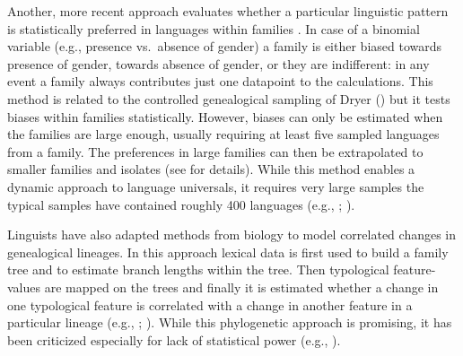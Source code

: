 \documentclass[output=collectionpaper]{langsci/langscibook}
\begin{document}
\newpage 
Another, more recent approach evaluates whether a particular linguistic pattern is statistically preferred in languages within families \citep{Bickel2013b}. In case of a binomial variable (e.g., presence vs.\ absence of gender) a family is either biased towards presence of gender, towards absence of gender, or they are indifferent: in any event a family always contributes just one datapoint to the calculations. This method is related to the controlled genealogical sampling of Dryer (\citeyear{Dryer1992,Dryer2000}) but it tests biases within families statistically. However, biases can only be estimated when the families are large enough, usually requiring at least five sampled languages from a family. The preferences in large families can then be extrapolated to smaller families and isolates (see \citealt{Bickel2013b} for details). While this method enables a dynamic approach to language universals, it requires very large samples \textendash{} the typical samples have contained roughly 400 languages (e.g., \citealt{Bickel2013b}; \citealt{Bickel2014}).

Linguists have also adapted methods from biology to model correlated changes in genealogical lineages. In this approach lexical data is first used to build a family tree and to estimate branch lengths within the tree. Then typological feature-values are mapped on the trees and finally it is estimated whether a change in one typological feature is correlated with a change in another feature in a particular lineage (e.g., \citealt{Dunn2011}; \citealt{Levinson2011}). While this phylogenetic approach is promising, it has been criticized especially for lack of statistical power (e.g., \citealt{Cysouw2011}).
\end{document}
